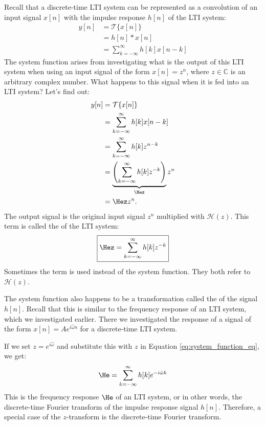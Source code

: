 Recall that a discrete-time LTI system can be represented as a
convolution of an input signal $x[n]$ with the impulse response $h[n]$
of the LTI system:
\begin{align}
y[n] &= \mathcal{T}\{x[n]\}\\
    &= h[n]*x[n]\\
     &= \sum_{k=-\infty}^{\infty} h[k] x[n-k]
\end{align}
The system function arises from investigating what is the output of
this LTI system when using an input signal of the form $x[n]=z^n$,
where $z\in \mathbb{C}$ is an arbitrary complex number. What happens
to this signal when it is fed into an LTI system? Let's find out:
\begin{align}
y[n] &= \mathcal{T}\{x[n]\}\\
     &= \sum_{k=-\infty}^{\infty} h[k] x[n-k]\\
     &= \sum_{k=-\infty}^{\infty} h[k] z^{n-k}\\
     &= \underbrace{\left(\sum_{k=-\infty}^{\infty} h[k] z^{-k}\right)}_{\Hez} z^n \\
     &= \Hez z^n.
\end{align}
The output signal is the original input signal $z^n$ multiplied with $\mathcal{H}(z)$. This term is called the \emph{} of the LTI system:
\begin{equation}
\boxed{
\Hez = \sum_{k=-\infty}^{\infty} h[k] z^{-k}
}
\label{eq:system_function_eq}
\end{equation}
Sometimes the term \emph{}
is used instead of the system function. 
They both refer to $\mathcal{H}(z)$. 

The system function also happens to be a transformation called
the \emph{} of the signal $h[n]$. Recall
that this is similar to the frequency response of an LTI system, which
we investigated earlier. There we investigated the response of a
signal of the form $x[n]=A e^{i\hat{\omega}n}$ for a discrete-time LTI
system.

If we set $z = e^{i\hat{\omega}}$ and substitute this with $z$ in
Equation \ref{eq:system_function_eq}, we get:
\begin{equation}
\He = \sum_{k=-\infty}^{\infty} h[k] e^{-i\hat{\omega}k}
\end{equation}
This is the frequency response $\He$ of an LTI system, or in other
words, the discrete-time Fourier transform of the impulse response
signal $h[n]$. Therefore, a special case of the $z$-transform is the
discrete-time Fourier transform.

